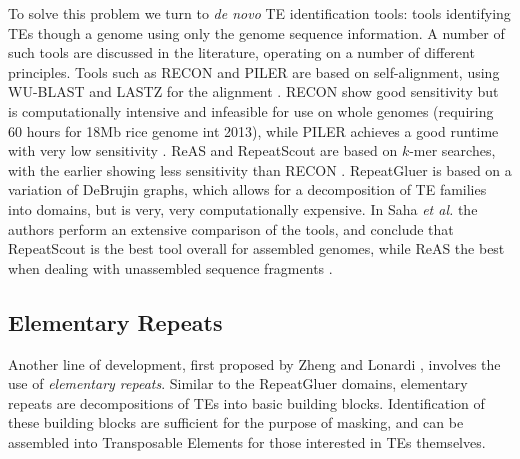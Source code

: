 \documentclass{bmcart}
\begin{document}
To solve this problem we turn to {\it de novo} TE identification
tools: tools identifying TEs though a genome using only the genome
sequence information.  A number of such tools are discussed in the
literature, operating on a number of different principles.  Tools such
as RECON and PILER are based on
self-alignment, using WU-BLAST and LASTZ for the alignment
\cite{Bao:2002,Edgar:2005p2365,Lopez:2003td,Harris:2007uf}.  RECON show good sensitivity but is
computationally intensive and infeasible for use on whole genomes
(requiring 60 hours for 18Mb rice genome int 2013), while
PILER achieves a good runtime with very low sensitivity
\cite{Jiang:2013jt}.  ReAS \cite{Li:2005he} and RepeatScout
\cite{Price:2005p1247} are based on $k$-mer searches, with the
earlier showing less sensitivity than RECON \cite{Jiang:2013jt}.
RepeatGluer \cite{Pevzner:2004p3157,Zhi:2006p3199} is
based on a variation of DeBrujin graphs, which allows for a
decomposition of TE families into domains, but is very, very
computationally expensive.  In Saha {\it et al.} the authors perform
an extensive comparison of the tools, and conclude that RepeatScout is
the best tool overall for assembled genomes, while ReAS the best when
dealing with unassembled sequence fragments \cite{Saha:2008dm}.


\subsection*{Elementary Repeats}
Another line of development, first proposed by Zheng and Lonardi
\cite{Zheng:2005bl}, involves the use of {\it elementary repeats}.
Similar to the RepeatGluer domains, elementary repeats are
decompositions of TEs into basic building blocks.  Identification of
these building blocks are sufficient for the purpose
of masking, and can be assembled into Transposable Elements for those
interested in TEs themselves.
\end{document}
